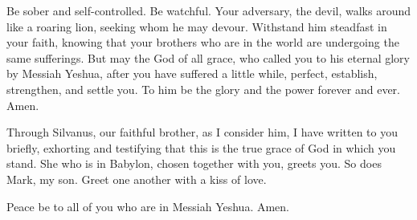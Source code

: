 \myverse{}Be sober and self-controlled. Be watchful. Your adversary, the devil, walks around like a roaring lion, seeking whom he may devour. \myverse{}Withstand him steadfast in your faith, knowing that your brothers who are in the world are undergoing the same sufferings. \myverse{}But may the God of all grace, who called you to his eternal glory by Messiah Yeshua, after you have suffered a little while, perfect, establish, strengthen, and settle you. \myverse{}To him be the glory and the power forever and ever. Amen.


\myverse{}Through Silvanus, our faithful brother, as I consider him, I have written to you briefly, exhorting and testifying that this is the true grace of God in which you stand. \myverse{}She who is in Babylon, chosen together with you, greets you. So does Mark, my son. \myverse{}Greet one another with a kiss of love.

Peace be to all of you who are in Messiah Yeshua. Amen.


